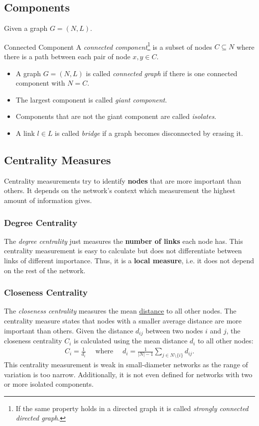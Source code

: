 \documentclass[english]{panikzettel}
\begin{document}
\subsection{Components}\label{sec:components}
Given a graph $ G = (N,L) $.

\begin{defi}{Connected Component}
	A \emph{connected component}\footnote{If the same property holds in a directed graph it is called \emph{strongly connected directed graph}.} is a subset of nodes $ C \subseteq N $ where there is a path between each pair of node $ x,y \in C $.

	\begin{itemize}
		\item A graph $ G = (N,L) $ is called \emph{connected graph} if there is one connected component with $ N = C $.
		\item The largest component is called \emph{giant component}.
		\item Components that are not the giant component are called \emph{isolates}.
		\item A link $ l \in L $ is called \emph{bridge} if a graph becomes disconnected by erasing it.
	\end{itemize}
\end{defi}

\subsection{Centrality Measures}
Centrality measurements try to identify \textbf{nodes} that are more important than others.
It depends on the network's context which measurement the highest amount of information gives.

\subsubsection{Degree Centrality}
The \emph{degree centrality} just measures the \textbf{number of links} each node has.
This centrality measurement is easy to calculate but does not differentiate between links of different importance.
Thus, it is a \textbf{local measure}, i.e. it does not depend on the rest of the network.

\subsubsection{Closeness Centrality}
The \emph{closeness centrality} measures the mean \hyperref[sec:distance]{distance} to all other nodes.
The centrality measure states that nodes with a smaller average distance are more important than others.
Given the distance $d_{ij}$ between two nodes $i$ and $j$, the closeness centrality $C_i$ is calculated using the mean distance $d_i$ to all other nodes:
\begin{align*}
	C_i = \frac{1}{d_i} \quad\text{ where }\quad d_i = \frac{1}{|N| - 1} \sum\limits_{j \in N \setminus \{i\}} d_{ij}.
\end{align*}
This centrality measurement is weak in small-diameter networks as the range of variation is too narrow.
Additionally, it is not even defined for networks with two or more isolated components.
\end{document}
